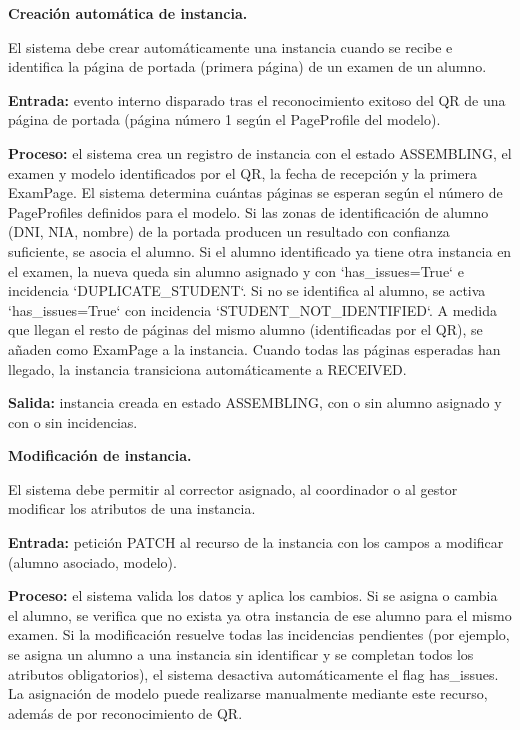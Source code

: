 \begin{functional}
  \begin{functional}
    \item \textbf{Creación automática de instancia.}

    El sistema debe crear automáticamente una instancia cuando se recibe e identifica la página de portada (primera página) de un examen de un alumno.

    \textbf{Entrada:} evento interno disparado tras el reconocimiento exitoso del QR de una página de portada (página número 1 según el PageProfile del modelo).

    \textbf{Proceso:} el sistema crea un registro de instancia con el estado ASSEMBLING, el examen y modelo identificados por el QR, la fecha de recepción y la primera ExamPage. El sistema determina cuántas páginas se esperan según el número de PageProfiles definidos para el modelo. Si las zonas de identificación de alumno (DNI, NIA, nombre) de la portada producen un resultado con confianza suficiente, se asocia el alumno. Si el alumno identificado ya tiene otra instancia en el examen, la nueva queda sin alumno asignado y con `has\_issues=True` e incidencia `DUPLICATE\_STUDENT`. Si no se identifica al alumno, se activa `has\_issues=True` con incidencia `STUDENT\_NOT\_IDENTIFIED`. A medida que llegan el resto de páginas del mismo alumno (identificadas por el QR), se añaden como ExamPage a la instancia. Cuando todas las páginas esperadas han llegado, la instancia transiciona automáticamente a RECEIVED.

    \textbf{Salida:} instancia creada en estado ASSEMBLING, con o sin alumno asignado y con o sin incidencias.

    \item \textbf{Modificación de instancia.}

    El sistema debe permitir al corrector asignado, al coordinador o al gestor modificar los atributos de una instancia.

    \textbf{Entrada:} petición PATCH al recurso de la instancia con los campos a modificar (alumno asociado, modelo).

    \textbf{Proceso:} el sistema valida los datos y aplica los cambios. Si se asigna o cambia el alumno, se verifica que no exista ya otra instancia de ese alumno para el mismo examen. Si la modificación resuelve todas las incidencias pendientes (por ejemplo, se asigna un alumno a una instancia sin identificar y se completan todos los atributos obligatorios), el sistema desactiva automáticamente el flag has\_issues. La asignación de modelo puede realizarse manualmente mediante este recurso, además de por reconocimiento de QR.


\end{functional}
\end{functional}
